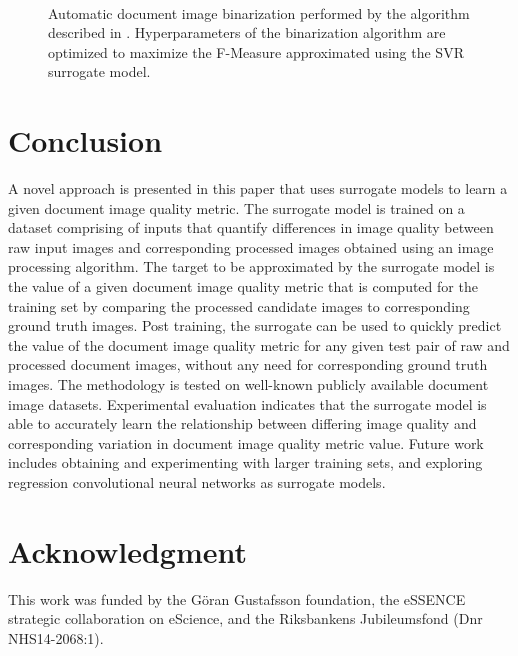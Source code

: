\documentclass[10pt, a4paper, conference, compsocconf]{IEEEtran}
\begin{document}
\begin{figure}[!t]
  \centering
\\
\caption{Automatic document image binarization performed by the algorithm described in \cite{vats2017automatic}. Hyperparameters of the binarization algorithm are optimized to maximize the F-Measure approximated using the SVR surrogate model.}
\label{fig_binRes}
\end{figure}

\section{Conclusion}
\label{sec:conclusion}
A novel approach is presented in this paper that uses surrogate models to learn a given document image quality metric. The surrogate model is trained on a dataset comprising of inputs that quantify differences in image quality between raw input images and corresponding processed images obtained using an image processing algorithm. The target to be approximated by the surrogate model is the value of a given document image quality metric that is computed for the training set by comparing the processed candidate images to corresponding ground truth images. Post training, the surrogate can be used to quickly predict the value of the document image quality metric for any given test pair of raw and processed document images, without any need for corresponding ground truth images. The methodology is tested on well-known publicly available document image datasets. Experimental evaluation indicates that the surrogate model is able to accurately learn the relationship between differing image quality and corresponding variation in document image quality metric value. Future work includes obtaining and experimenting with larger training sets, and exploring regression convolutional neural networks as surrogate models.



\section*{Acknowledgment}
This work was funded by the G\"oran Gustafsson foundation, the eSSENCE strategic collaboration on eScience, and the Riksbankens Jubileumsfond (Dnr NHS14-2068:1).








\end{document}

